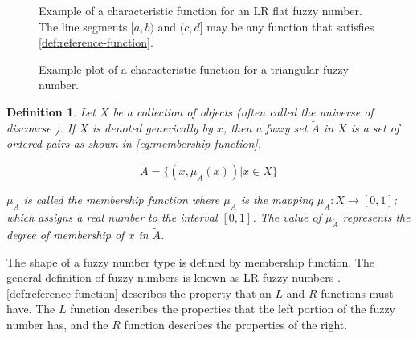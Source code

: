 \documentclass[ee,thesis]{usuthesis}
\newtheorem{definition}{Definition}[section]
\begin{document}
\begin{subfigures}
    \begin{figure}[htpb]
    \centering
        
        \caption{Example of a characteristic function for an LR flat fuzzy number. The line segments $[a,b)$ and $(c,d]$
          may be any function that satisfies \ref{def:reference-function}.}
        \label{fig:lr-fuzzy-characteristic}
    \end{figure}
    \hfill

    \begin{figure}[htpb]
    \centering
        
        \caption{Example plot of a characteristic function for a triangular fuzzy number.}
        \label{fig:triang-characteristic}
    \end{figure}
\end{subfigures}

\begin{definition}
\label{def:membership-function}
Let \(X\) be a collection of objects (often called the universe of discourse \cite{bello-2019-fuzzy-activ}). If \(X\) is denoted
generically by \(x\), then a fuzzy set \(\tilde{A}\) in \(X\) is a set of ordered pairs as shown in \ref{eq:membership-function}.

\begin{equation}
\label{eq:membership-function}
\tilde{A} = \{(x, \mu_{\tilde{A}}(x))| x\in X\}
\end{equation}

\noindent
\(\mu_{\tilde{A}}\) is called the membership function where \(\mu_{\tilde{A}}\) is the mapping \(\mu_{\tilde{A}} : X \rightarrow
[0,1]\); which assigns a real number to the interval \([0,1]\). The value of \(\mu_{\tilde{A}}\) represents the degree of
membership of \(x\) in \(\tilde{A}\).
\end{definition}

The shape of a fuzzy number type is defined by membership function. The general definition of fuzzy numbers is known as
LR fuzzy numbers \cite{kaur-2016-introd-fuzzy,zimmermann-2001-fuzzy-set}. \ref{def:reference-function} describes the
property that an \(L\) and \(R\) functions must have. The \(L\) function describes the properties that the left portion of the
fuzzy number has, and the \(R\) function describes the properties of the right.
\end{document}
